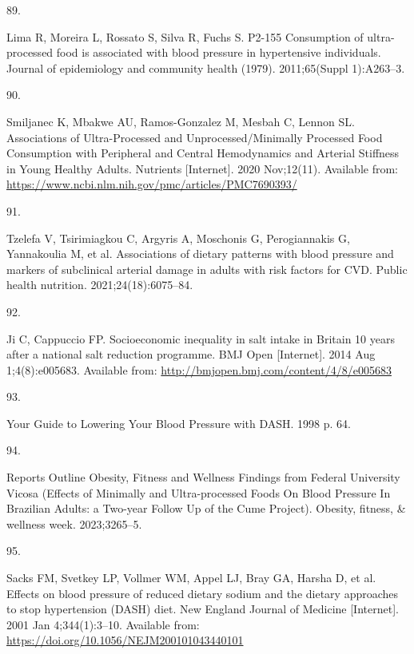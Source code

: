 \documentclass[
]{article}
\newlength{\cslhangindent}
\newlength{\csllabelwidth}
\newlength{\cslentryspacingunit} %
\newenvironment{CSLReferences}[2] %
 {%
  \setlength{\parindent}{0pt}
  \ifodd #1
  \let\oldpar\par
  \def\par{\hangindent=\cslhangindent\oldpar}
  \fi
  \setlength{\parskip}{#2\cslentryspacingunit}
 }%
 {}
\newcommand{\CSLLeftMargin}[1]{\parbox[t]{\csllabelwidth}{#1}}
\newcommand{\CSLRightInline}[1]{\parbox[t]{\linewidth - \csllabelwidth}{#1}\break}
\begin{document}
\begin{CSLReferences}{0}{0}
\leavevmode{}%
\CSLLeftMargin{89. }%
\CSLRightInline{Lima R, Moreira L, Rossato S, Silva R, Fuchs S. P2-155
Consumption of ultra-processed food is associated with blood pressure in
hypertensive individuals. Journal of epidemiology and community health
(1979). 2011;65(Suppl 1):A263--3. }

\leavevmode{}%
\CSLLeftMargin{90. }%
\CSLRightInline{Smiljanec K, Mbakwe AU, Ramos-Gonzalez M, Mesbah C,
Lennon SL. Associations of Ultra-Processed and Unprocessed/Minimally
Processed Food Consumption with Peripheral and Central Hemodynamics and
Arterial Stiffness in Young Healthy Adults. Nutrients {[}Internet{]}.
2020 Nov;12(11). Available from:
\url{https://www.ncbi.nlm.nih.gov/pmc/articles/PMC7690393/}}

\leavevmode{}%
\CSLLeftMargin{91. }%
\CSLRightInline{Tzelefa V, Tsirimiagkou C, Argyris A, Moschonis G,
Perogiannakis G, Yannakoulia M, et al. Associations of dietary patterns
with blood pressure and markers of subclinical arterial damage in adults
with risk factors for {CVD}. Public health nutrition.
2021;24(18):6075--84. }

\leavevmode{}%
\CSLLeftMargin{92. }%
\CSLRightInline{Ji C, Cappuccio FP. Socioeconomic inequality in salt
intake in Britain 10 years after a national salt reduction programme.
BMJ Open {[}Internet{]}. 2014 Aug 1;4(8):e005683. Available from:
\url{http://bmjopen.bmj.com/content/4/8/e005683}}

\leavevmode{}%
\CSLLeftMargin{93. }%
\CSLRightInline{Your Guide to Lowering Your Blood Pressure with DASH.
1998 p. 64. }

\leavevmode{}%
\CSLLeftMargin{94. }%
\CSLRightInline{Reports Outline Obesity, Fitness and Wellness Findings
from Federal University Vicosa (Effects of Minimally and Ultra-processed
Foods On Blood Pressure In Brazilian Adults: a Two-year Follow Up of the
Cume Project). Obesity, fitness, \& wellness week. 2023;3265--5. }

\leavevmode{}%
\CSLLeftMargin{95. }%
\CSLRightInline{Sacks FM, Svetkey LP, Vollmer WM, Appel LJ, Bray GA,
Harsha D, et al. Effects on blood pressure of reduced dietary sodium and
the dietary approaches to stop hypertension (DASH) diet. New England
Journal of Medicine {[}Internet{]}. 2001 Jan 4;344(1):3--10. Available
from: \url{https://doi.org/10.1056/NEJM200101043440101}}


\end{CSLReferences}
\end{document}
